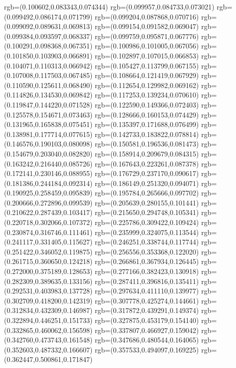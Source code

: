 {{{			rgb=(0.100602,0.083343,0.074344)
			rgb=(0.099957,0.084733,0.073021)
			rgb=(0.099492,0.086174,0.071799)
			rgb=(0.099204,0.087868,0.070716)
			rgb=(0.099092,0.089631,0.069813)
			rgb=(0.099154,0.091582,0.069047)
			rgb=(0.099384,0.093597,0.068337)
			rgb=(0.099759,0.095871,0.067776)
			rgb=(0.100291,0.098368,0.067351)
			rgb=(0.100986,0.101005,0.067056)
			rgb=(0.101850,0.103903,0.066891)
			rgb=(0.102897,0.107015,0.066853)
			rgb=(0.104071,0.110313,0.066942)
			rgb=(0.105427,0.113799,0.067155)
			rgb=(0.107008,0.117503,0.067485)
			rgb=(0.108664,0.121419,0.067929)
			rgb=(0.110590,0.125611,0.068490)
			rgb=(0.112654,0.129982,0.069162)
			rgb=(0.114826,0.134530,0.069842)
			rgb=(0.117253,0.139234,0.070610)
			rgb=(0.119847,0.144220,0.071528)
			rgb=(0.122590,0.149366,0.072403)
			rgb=(0.125578,0.154671,0.073463)
			rgb=(0.128666,0.160153,0.074429)
			rgb=(0.131965,0.165838,0.075451)
			rgb=(0.135397,0.171688,0.076499)
			rgb=(0.138981,0.177714,0.077615)
			rgb=(0.142733,0.183822,0.078814)
			rgb=(0.146576,0.190103,0.080098)
			rgb=(0.150581,0.196536,0.081473)
			rgb=(0.154679,0.203040,0.082820)
			rgb=(0.158914,0.209679,0.084315)
			rgb=(0.163242,0.216440,0.085726)
			rgb=(0.167643,0.223261,0.087378)
			rgb=(0.172141,0.230146,0.088955)
			rgb=(0.176729,0.237170,0.090617)
			rgb=(0.181386,0.244184,0.092314)
			rgb=(0.186149,0.251320,0.094071)
			rgb=(0.190925,0.258459,0.095839)
			rgb=(0.195784,0.265666,0.097702)
			rgb=(0.200666,0.272896,0.099539)
			rgb=(0.205639,0.280155,0.101441)
			rgb=(0.210622,0.287439,0.103417)
			rgb=(0.215650,0.294748,0.105341)
			rgb=(0.220718,0.302066,0.107372)
			rgb=(0.225786,0.309422,0.109424)
			rgb=(0.230874,0.316746,0.111461)
			rgb=(0.235999,0.324075,0.113544)
			rgb=(0.241117,0.331405,0.115627)
			rgb=(0.246251,0.338744,0.117744)
			rgb=(0.251422,0.346052,0.119875)
			rgb=(0.256556,0.353368,0.122020)
			rgb=(0.261715,0.360650,0.124218)
			rgb=(0.266861,0.367934,0.126445)
			rgb=(0.272000,0.375189,0.128653)
			rgb=(0.277166,0.382423,0.130918)
			rgb=(0.282309,0.389635,0.133156)
			rgb=(0.287411,0.396816,0.135411)
			rgb=(0.292531,0.403983,0.137728)
			rgb=(0.297634,0.411110,0.139977)
			rgb=(0.302709,0.418200,0.142319)
			rgb=(0.307778,0.425274,0.144661)
			rgb=(0.312834,0.432309,0.146987)
			rgb=(0.317872,0.439291,0.149374)
			rgb=(0.322894,0.446251,0.151733)
			rgb=(0.327875,0.453179,0.154140)
			rgb=(0.332865,0.460062,0.156598)
			rgb=(0.337807,0.466927,0.159042)
			rgb=(0.342760,0.473743,0.161548)
			rgb=(0.347686,0.480544,0.164065)
			rgb=(0.352603,0.487332,0.166607)
			rgb=(0.357533,0.494097,0.169225)
			rgb=(0.362447,0.500861,0.171847)
}}}
